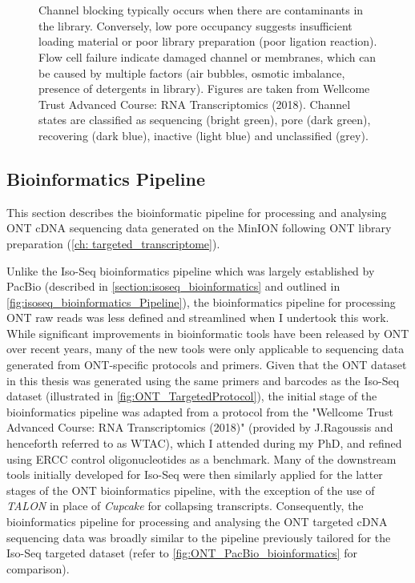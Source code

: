 \begin{figure}[]
{	\\ \\
	Channel blocking typically occurs when there are contaminants in the library. Conversely, low pore occupancy suggests insufficient loading material or poor library preparation (poor ligation reaction). Flow cell failure indicate damaged channel or membranes, which can be caused by multiple factors (air bubbles, osmotic imbalance, presence of detergents in library). Figures are taken from Wellcome Trust Advanced Course: RNA Transcriptomics (2018). Channel states are classified as sequencing (bright green), pore (dark green), recovering (dark blue), inactive (light blue) and unclassified (grey).}
	\label{fig:ONTPoreOccupancy}
\end{figure}

\clearpage
\subsection{Bioinformatics Pipeline}
\label{section:ont_bioinformatics}
This section describes the bioinformatic pipeline for processing and analysing ONT cDNA sequencing data generated on the MinION following ONT library preparation (\cref{ch: targeted_transcriptome}). 

Unlike the Iso-Seq bioinformatics pipeline which was largely established by PacBio (described in \cref{section:isoseq_bioinformatics} and outlined in \cref{fig:isoseq_bioinformatics_Pipeline}), the bioinformatics pipeline for processing ONT raw reads was less defined and streamlined when I undertook this work. While significant improvements in bioinformatic tools have been released by ONT over recent years, many of the new tools were only applicable to sequencing data generated from ONT-specific protocols and primers. Given that the ONT dataset in this thesis was generated using the same primers and barcodes as the Iso-Seq dataset (illustrated in \cref{fig:ONT_TargetedProtocol}), the initial stage of the bioinformatics pipeline was adapted from a protocol from the "Wellcome Trust Advanced Course: RNA Transcriptomics (2018)" (provided by J.Ragoussis and henceforth referred to as WTAC), which I attended during my PhD, and refined using ERCC control oligonucleotides as a benchmark. Many of the downstream tools initially developed for Iso-Seq were then similarly applied for the latter stages of the ONT bioinformatics pipeline, with the exception of the use of \textit{TALON} in place of \textit{Cupcake} for collapsing transcripts. Consequently, the bioinformatics pipeline for processing and analysing the ONT targeted cDNA sequencing data was broadly similar to the pipeline previously tailored for the Iso-Seq targeted dataset (refer to \cref{fig:ONT_PacBio_bioinformatics} for comparison). 

